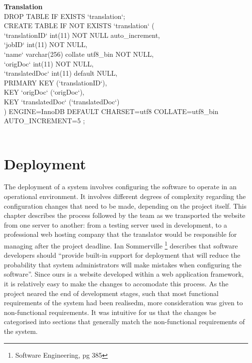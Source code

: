 \documentclass{l3proj}
\begin{document}
{\textbf{Translation}
\\
DROP TABLE IF EXISTS `translation`;\\
CREATE TABLE IF NOT EXISTS `translation` (\\
  `translationID` int(11) NOT NULL auto\_increment,\\
  `jobID` int(11) NOT NULL,\\
  `name` varchar(256) collate utf8\_bin NOT NULL,\\
  `origDoc` int(11) NOT NULL,\\
  `translatedDoc` int(11) default NULL,\\
  PRIMARY KEY  (`translationID`),\\
  KEY `origDoc` (`origDoc`),\\
  KEY `translatedDoc` (`translatedDoc`)\\
) ENGINE=InnoDB  DEFAULT CHARSET=utf8 COLLATE=utf8\_bin AUTO\_INCREMENT=5 ;\\
\\
}

\chapter{Deployment}
\label{chap:deply}
The deployment of a system involves configuring the software to operate in an operational 
environment. It involves different degrees of complexity regarding the configuration
changes that need to be made, depending on the project itself. This chapter describes 
the process followed by the team as we transported the website from one server to another: 
from a testing server used in development, to a professional web hosting company
that the translator would be responsible for managing after the project deadline.\newline
Ian Sommerville \footnote{Software Engineering, pg 385} describes that software developers 
should ``provide built-in support for deployment that will reduce the probability that system 
administrators will make mistakes when configuring the software''. Since ours is a 
website developed within a web application framework, it is relatively easy to make the
changes to accomodate this process. As the project neared the end of development stages, such
that most functional requirements of the system had been realisedm, more consideration was given
to non-functional requirements. It was intuitive for us that the changes be categorised 
into sections that generally match the non-functional requirements of the system.
\end{document}
